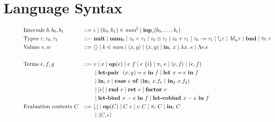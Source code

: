 \section{Language Syntax}

\begin{figure}[tbp]
  \begin{alignat*}{3}
         &\text{Intervals } b, b_0, b_1 &::=~ &\epsilon
         \mid (k_0, k_1) \in \textit{num}^{2}
         \mid \mathbf{iop}_c(b_0, \ldots, b_c) \\
         &\text{Types } \tau, \tau_0, \tau_1 &::=~ &\mathbf{unit}
         \mid \num_{b}
         \mid \tau_0 \times \tau_1
         \mid \tau_0 \otimes \tau_1
         \mid \tau_0 + \tau_1
         \mid \tau_0 \multimap \tau_1
         \mid {\bang{s} \tau}
         \mid {M_u \tau}
         \mid \textbf{bnd}
         \mid \forall \epsilon . \tau
         \\
         &\text{Values } v, w \ &::=~ &\langle \rangle
         \mid k \in \textit{num}
         \mid \langle x,y \rangle 
         \mid (x, y)
         \mid \tin_i \ x
         \mid \lambda x.~e
         \mid \Lambda \epsilon . e \\
         \\
         &\text{Terms } e, f, g &::=~ &v
         \mid x
         \mid \mathbf{op}(e)
         \mid e~f
         \mid e~\{i\}
         \mid {\pi}_i\ e
         \mid \langle e,f \rangle 
         \mid (e, f) \\
         & & & \mid \letpair \ (x,y) = e \ \tin \ f
         \mid \letassign x  = e \ \tin \ f \\
         & & & \mid \tin_i \ e
         \mid 
          \mathbf{case} \ e \ \mathbf{of} \ (\tin_1 \ x.f_1 \ | \ \tin_2 \ x.f_2) \\
         & & &
         \mid [e]
         \mid \rnd e
         \mid {\ret e} 
         \mid \factor e \\
         & & & 
         \mid {\letbind x = e \ \tin \ f}
         \mid \letcobind x = e \ \tin \ f
         \\
         &\text{Evaluation contexts } C &::=~ &[.] 
         \mid \mathbf{op}(C) 
         \mid C~e 
         \mid v~C 
         \mid \pi_i~C 
         \mid \mathbf{in}_i~C \\
         & & &
         \mid \langle C, e \rangle

\end{alignat*}
\end{figure}
